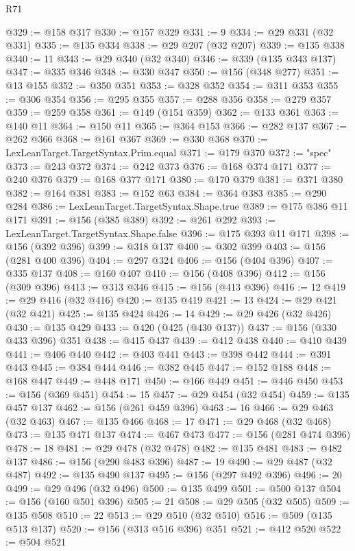 \begin{lexlean}{R71}
\begin{coremodule}
@329 := @158 @317
@330 := @157 @329
@331 := 9
@334 := @29 @331 (@32 @331)
@335 := @135 @334
@338 := @29 @207 (@32 @207)
@339 := @135 @338
@340 := 11
@343 := @29 @340 (@32 @340)
@346 := @339 (@135 @343 @137)
@347 := @335 @346
@348 := @330 @347
@350 := @156 (@348 @277)
@351 := @13 @155
@352 := @350 @351
@353 := @328 @352
@354 := @311 @353
@355 := @306 @354
@356 := @295 @355
@357 := @288 @356
@358 := @279 @357
@359 := @259 @358
@361 := @149 (@154 @359)
@362 := @133 @361
@363 := @140 @11
@364 := @150 @11
@365 := @364 @153
@366 := @282 @137
@367 := @262 @366
@368 := @161 @367
@369 := @330 @368
@370 := LexLeanTarget.TargetSyntax.Prim.equal
@371 := @179 @370
@372 := "spec"
@373 := @243 @372
@374 := @242 @373
@376 := @168 @374 @171
@377 := @240 @376
@379 := @168 @377 @171
@380 := @170 @379
@381 := @371 @380
@382 := @164 @381
@383 := @152 @63
@384 := @364 @383
@385 := @290 @284
@386 := LexLeanTarget.TargetSyntax.Shape.true
@389 := @175 @386 @11 @171
@391 := @156 (@385 @389)
@392 := @261 @292
@393 := LexLeanTarget.TargetSyntax.Shape.false
@396 := @175 @393 @11 @171
@398 := @156 (@392 @396)
@399 := @318 @137
@400 := @302 @399
@403 := @156 (@281 @400 @396)
@404 := @297 @324
@406 := @156 (@404 @396)
@407 := @335 @137
@408 := @160 @407
@410 := @156 (@408 @396)
@412 := @156 (@309 @396)
@413 := @313 @346
@415 := @156 (@413 @396)
@416 := 12
@419 := @29 @416 (@32 @416)
@420 := @135 @419
@421 := 13
@424 := @29 @421 (@32 @421)
@425 := @135 @424
@426 := 14
@429 := @29 @426 (@32 @426)
@430 := @135 @429
@433 := @420 (@425 (@430 @137))
@437 := @156 (@330 @433 @396) @351
@438 := @415 @437
@439 := @412 @438
@440 := @410 @439
@441 := @406 @440
@442 := @403 @441
@443 := @398 @442
@444 := @391 @443
@445 := @384 @444
@446 := @382 @445
@447 := @152 @188
@448 := @168 @447
@449 := @448 @171
@450 := @166 @449
@451 := @446 @450
@453 := @156 (@369 @451)
@454 := 15
@457 := @29 @454 (@32 @454)
@459 := @135 @457 @137
@462 := @156 (@261 @459 @396)
@463 := 16
@466 := @29 @463 (@32 @463)
@467 := @135 @466
@468 := 17
@471 := @29 @468 (@32 @468)
@473 := @135 @471 @137
@474 := @467 @473
@477 := @156 (@281 @474 @396)
@478 := 18
@481 := @29 @478 (@32 @478)
@482 := @135 @481
@483 := @482 @137
@486 := @156 (@290 @483 @396)
@487 := 19
@490 := @29 @487 (@32 @487)
@492 := @135 @490 @137
@495 := @156 (@297 @492 @396)
@496 := 20
@499 := @29 @496 (@32 @496)
@500 := @135 @499
@501 := @500 @137
@504 := @156 (@160 @501 @396)
@505 := 21
@508 := @29 @505 (@32 @505)
@509 := @135 @508
@510 := 22
@513 := @29 @510 (@32 @510)
@516 := @509 (@135 @513 @137)
@520 := @156 (@313 @516 @396) @351
@521 := @412 @520
@522 := @504 @521

\end{coremodule}
\end{lexlean}
